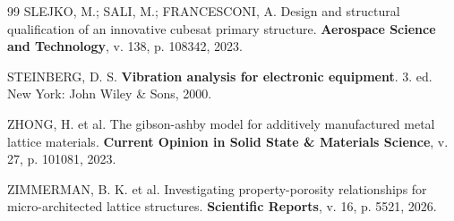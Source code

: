 \documentclass[12pt,a4paper]{report}
\begin{document}
\begin{thebibliography}{99}
SLEJKO, M.; SALI, M.; FRANCESCONI, A. Design and structural qualification of an innovative cubesat primary structure. \textbf{Aerospace Science and Technology}, v. 138, p. 108342, 2023.

STEINBERG, D. S. \textbf{Vibration analysis for electronic equipment}. 3. ed. New York: John Wiley \& Sons, 2000.

ZHONG, H. et al. The gibson-ashby model for additively manufactured metal lattice materials. \textbf{Current Opinion in Solid State \& Materials Science}, v. 27, p. 101081, 2023.

ZIMMERMAN, B. K. et al. Investigating property-porosity relationships for micro-architected lattice structures. \textbf{Scientific Reports}, v. 16, p. 5521, 2026.

\end{thebibliography}
\end{document}
